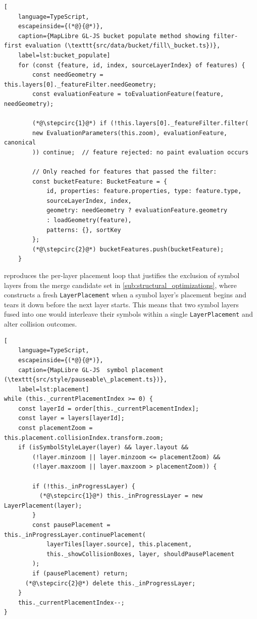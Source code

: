 \begin{lstlisting}[
	language=TypeScript,
	escapeinside={(*@}{@*)},
	caption={MapLibre GL-JS bucket populate method showing filter-first evaluation (\texttt{src/data/bucket/fill\_bucket.ts})},
	label=lst:bucket_populate]
	for (const {feature, id, index, sourceLayerIndex} of features) {
		const needGeometry = this.layers[0]._featureFilter.needGeometry;
		const evaluationFeature = toEvaluationFeature(feature, needGeometry);
		
		(*@\stepcirc{1}@*) if (!this.layers[0]._featureFilter.filter(
		new EvaluationParameters(this.zoom), evaluationFeature, canonical
		)) continue;  // feature rejected: no paint evaluation occurs
		
		// Only reached for features that passed the filter:
		const bucketFeature: BucketFeature = {
			id, properties: feature.properties, type: feature.type,
			sourceLayerIndex, index,
			geometry: needGeometry ? evaluationFeature.geometry
			: loadGeometry(feature),
			patterns: {}, sortKey
		};
		(*@\stepcirc{2}@*) bucketFeatures.push(bucketFeature);
	}
\end{lstlisting}

 reproduces the per-layer placement loop that justifies the exclusion of symbol layers from the merge candidate set in \cref{sub:structural_optimizations}, where  constructs a fresh \texttt{LayerPlacement} when a symbol layer's placement begins and  tears it down before the next layer starts.
This means that two symbol layers fused into one would interleave their symbols within a single \texttt{LayerPlacement} and alter collision outcomes.

\begin{lstlisting}[
	language=TypeScript,
	escapeinside={(*@}{@*)},
	caption={MapLibre GL-JS  symbol placement (\texttt{src/style/pauseable\_placement.ts})},
	label=lst:placement]
while (this._currentPlacementIndex >= 0) {
    const layerId = order[this._currentPlacementIndex];
    const layer = layers[layerId];
    const placementZoom = this.placement.collisionIndex.transform.zoom;
    if (isSymbolStyleLayer(layer) && layer.layout &&
        (!layer.minzoom || layer.minzoom <= placementZoom) &&
        (!layer.maxzoom || layer.maxzoom > placementZoom)) {

        if (!this._inProgressLayer) {
          (*@\stepcirc{1}@*) this._inProgressLayer = new LayerPlacement(layer);
        }
        const pausePlacement = this._inProgressLayer.continuePlacement(
            layerTiles[layer.source], this.placement,
            this._showCollisionBoxes, layer, shouldPausePlacement
        );
        if (pausePlacement) return;
      (*@\stepcirc{2}@*) delete this._inProgressLayer;
    }
    this._currentPlacementIndex--;
}
\end{lstlisting}


